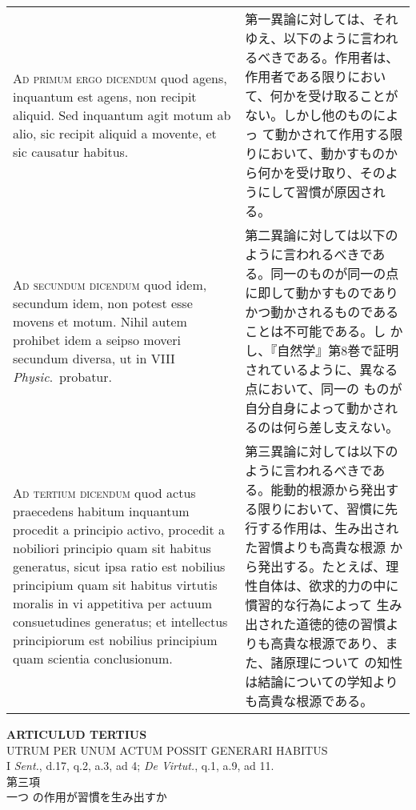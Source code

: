 \documentclass[10pt]{jsarticle} %
\begin{document}
\begin{longtable}{p{21em}p{21em}}
\\




{\scshape Ad primum ergo dicendum} quod agens, inquantum est agens,
non recipit aliquid. Sed inquantum agit motum ab alio, sic recipit
aliquid a movente, et sic causatur habitus.

&

第一異論に対しては、それゆえ、以下のように言われるべきである。作用者は、
作用者である限りにおいて、何かを受け取ることがない。しかし他のものによっ
て動かされて作用する限りにおいて、動かすものから何かを受け取り、そのよ
うにして習慣が原因される。

\\




{\scshape Ad secundum dicendum} quod idem, secundum idem, non potest
esse movens et motum. Nihil autem prohibet idem a seipso moveri
secundum diversa, ut in VIII {\itshape Physic}.~probatur.

&

第二異論に対しては以下のように言われるべきである。同一のものが同一の点
に即して動かすものでありかつ動かされるものであることは不可能である。し
かし、『自然学』第8巻で証明されているように、異なる点において、同一の
ものが自分自身によって動かされるのは何ら差し支えない。

\\




{\scshape Ad tertium dicendum} quod actus praecedens habitum inquantum
procedit a principio activo, procedit a nobiliori principio quam sit
habitus generatus, sicut ipsa ratio est nobilius principium quam sit
habitus virtutis moralis in vi appetitiva per actuum consuetudines
generatus; et intellectus principiorum est nobilius principium quam
scientia conclusionum.

&

第三異論に対しては以下のように言われるべきである。能動的根源から発出す
る限りにおいて、習慣に先行する作用は、生み出された習慣よりも高貴な根源
から発出する。たとえば、理性自体は、欲求的力の中に慣習的な行為によって
生み出された道徳的徳の習慣よりも高貴な根源であり、また、諸原理について
の知性は結論についての学知よりも高貴な根源である。

\\



\end{longtable}
\newpage

\begin{center}
{\Large {\bf ARTICULUD TERTIUS}}\\ {\large UTRUM PER UNUM ACTUM POSSIT
GENERARI HABITUS}\\ {\footnotesize I {\itshape Sent.}, d.17, q.2, a.3,
ad 4; {\itshape De Virtut.}, q.1, a.9, ad 11.}\\ {\Large 第三項\\一つ
の作用が習慣を生み出すか}
\end{center}
\end{document}
